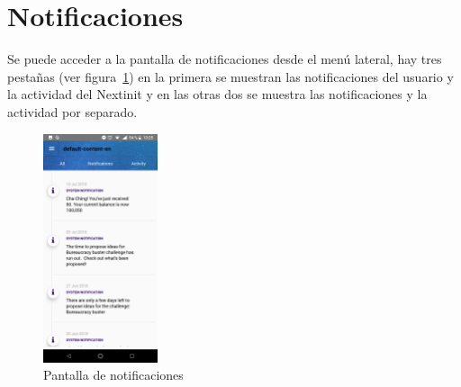 \section{Notificaciones}

Se puede acceder a la pantalla de notificaciones desde el menú lateral, hay tres pestañas 
(ver figura~\ref{fig:notificaciones}) en la primera se muestran las notificaciones del usuario 
y la actividad del Nextinit y en las otras dos se muestra las notificaciones y la actividad 
por separado.

\begin{figure}[!h]
	\begin{center}
		\includegraphics[width=0.3\textwidth]{./img/anexo1/notificaciones_all.png}
		\caption{Pantalla de notificaciones}
		\label{fig:notificaciones}
	\end{center}
\end{figure}
